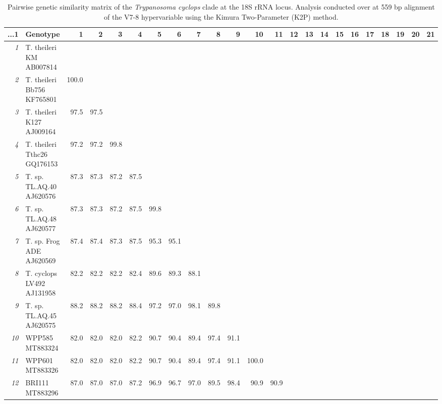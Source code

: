 \documentclass[a4paper, nobind]{templates/ociamthesis}
\begin{document}
\begin{landscape}\begingroup\fontsize{8.5}{10.5}\selectfont

\begin{longtable}[t]{>{}rlrrrrrrrrrrrrrrrrrrrrl}
\caption[Pairwise genetic similarity matrix of the \textit{Trypanosoma cyclops} clade.]{\label{tab:TA62}Pairwise genetic similarity matrix of the \textit{Trypanosoma cyclops} clade at the 18S rRNA locus. Analysis conducted over at 559 bp alignment of the V7-8 hypervariable using the Kimura Two-Parameter (K2P) method.}\\
\toprule
...1 & Genotype & 1 & 2 & 3 & 4 & 5 & 6 & 7 & 8 & 9 & 10 & 11 & 12 & 13 & 14 & 15 & 16 & 17 & 18 & 19 & 20 & 21\\
\midrule
\em{1} & T. theileri KM AB007814 &  &  &  &  &  &  &  &  &  &  &  &  &  &  &  &  &  &  &  &  & \\
\em{2} & T. theileri Bb756 KF765801 & 100.0 &  &  &  &  &  &  &  &  &  &  &  &  &  &  &  &  &  &  &  & \\
\em{3} & T. theileri K127 AJ009164 & 97.5 & 97.5 &  &  &  &  &  &  &  &  &  &  &  &  &  &  &  &  &  &  & \\
\em{4} & T. theileri Tthc26 GQ176153 & 97.2 & 97.2 & 99.8 &  &  &  &  &  &  &  &  &  &  &  &  &  &  &  &  &  & \\
\em{5} & T. sp. TL.AQ.40 AJ620576 & 87.3 & 87.3 & 87.2 & 87.5 &  &  &  &  &  &  &  &  &  &  &  &  &  &  &  &  & \\
\em{6} & T. sp. TL.AQ.48 AJ620577 & 87.3 & 87.3 & 87.2 & 87.5 & 99.8 &  &  &  &  &  &  &  &  &  &  &  &  &  &  &  & \\
\em{7} & T. sp. Frog ADE AJ620569 & 87.4 & 87.4 & 87.3 & 87.5 & 95.3 & 95.1 &  &  &  &  &  &  &  &  &  &  &  &  &  &  & \\
\em{8} & T. cyclops LV492 AJ131958 & 82.2 & 82.2 & 82.2 & 82.4 & 89.6 & 89.3 & 88.1 &  &  &  &  &  &  &  &  &  &  &  &  &  & \\
\em{9} & T. sp. TL.AQ.45 AJ620575 & 88.2 & 88.2 & 88.2 & 88.4 & 97.2 & 97.0 & 98.1 & 89.8 &  &  &  &  &  &  &  &  &  &  &  &  & \\
\em{10} & WPP585 MT883324 & 82.0 & 82.0 & 82.0 & 82.2 & 90.7 & 90.4 & 89.4 & 97.4 & 91.1 &  &  &  &  &  &  &  &  &  &  &  & \\
\em{11} & WPP601 MT883326 & 82.0 & 82.0 & 82.0 & 82.2 & 90.7 & 90.4 & 89.4 & 97.4 & 91.1 & 100.0 &  &  &  &  &  &  &  &  &  &  & \\
\em{12} & BRI111 MT883296 & 87.0 & 87.0 & 87.0 & 87.2 & 96.9 & 96.7 & 97.0 & 89.5 & 98.4 & 90.9 & 90.9 &  &  &  &  &  &  &  &  &  & \\

\end{longtable}
\end{landscape}
\end{document}
